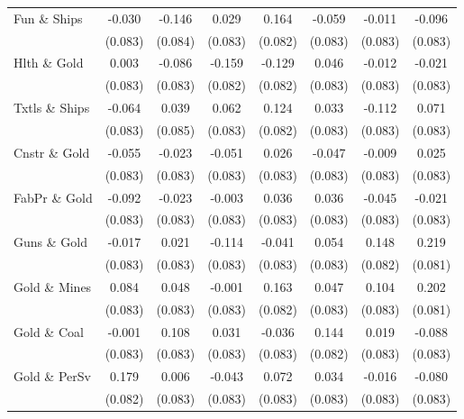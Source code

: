 \begin{table}
\begin{tabular}[t]{lccccccc}
Fun \& Ships & -0.030 & -0.146 & 0.029 & 0.164 & -0.059 & -0.011 & -0.096\\
 & (0.083) & (0.084) & (0.083) & (0.082) & (0.083) & (0.083) & (0.083)\\
\addlinespace
Hlth \& Gold & 0.003 & -0.086 & -0.159 & -0.129 & 0.046 & -0.012 & -0.021\\
 & (0.083) & (0.083) & (0.082) & (0.082) & (0.083) & (0.083) & (0.083)\\
Txtls \& Ships & -0.064 & 0.039 & 0.062 & 0.124 & 0.033 & -0.112 & 0.071\\
 & (0.083) & (0.085) & (0.083) & (0.082) & (0.083) & (0.083) & (0.083)\\
Cnstr \& Gold & -0.055 & -0.023 & -0.051 & 0.026 & -0.047 & -0.009 & 0.025\\
\addlinespace
 & (0.083) & (0.083) & (0.083) & (0.083) & (0.083) & (0.083) & (0.083)\\
FabPr \& Gold & -0.092 & -0.023 & -0.003 & 0.036 & 0.036 & -0.045 & -0.021\\
 & (0.083) & (0.083) & (0.083) & (0.083) & (0.083) & (0.083) & (0.083)\\
Guns \& Gold & -0.017 & 0.021 & -0.114 & -0.041 & 0.054 & 0.148 & 0.219\\
 & (0.083) & (0.083) & (0.083) & (0.083) & (0.083) & (0.082) & (0.081)\\
\addlinespace
Gold \& Mines & 0.084 & 0.048 & -0.001 & 0.163 & 0.047 & 0.104 & 0.202\\
 & (0.083) & (0.083) & (0.083) & (0.082) & (0.083) & (0.083) & (0.081)\\
Gold \& Coal & -0.001 & 0.108 & 0.031 & -0.036 & 0.144 & 0.019 & -0.088\\
 & (0.083) & (0.083) & (0.083) & (0.083) & (0.082) & (0.083) & (0.083)\\
Gold \& PerSv & 0.179 & 0.006 & -0.043 & 0.072 & 0.034 & -0.016 & -0.080\\
\addlinespace
 & (0.082) & (0.083) & (0.083) & (0.083) & (0.083) & (0.083) & (0.083)\\
\bottomrule
\end{tabular}
\end{table}
